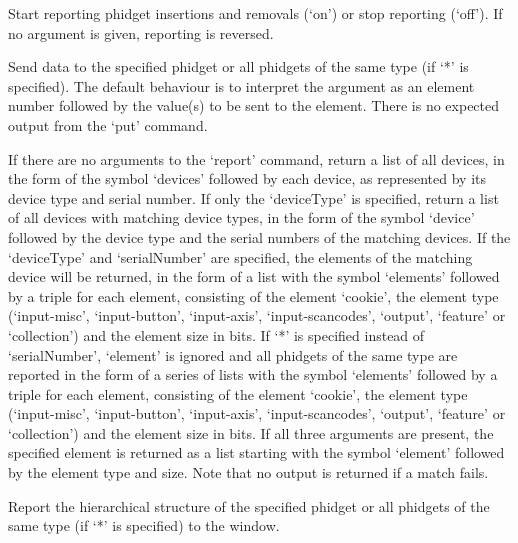   Start reporting phidget insertions and removals (`on') or stop reporting (`off').
  If no argument is given, reporting is reversed. 

  Send data to the specified phidget or all phidgets of the same type (if `*' is specified).
  The default behaviour is to interpret the argument as an element number followed by the value(s) to be sent
  to the element.
  There is no expected output from the `put' command.

  If there are no arguments to the `report' command, return a list of all devices, in the form of the symbol `devices'
  followed by each device, as represented by its device type and serial number.
  If only the `deviceType' is specified, return a list of all devices with matching device types, in the form of the
  symbol `device' followed by the device type and the serial numbers of the matching devices.
  If the `deviceType' and `serialNumber' are specified, the elements of the matching device will be returned,
  in the form of a list with the symbol `elements' followed by a triple for each element,
  consisting of the element `cookie', the element type
  (`input-misc', `input-button', `input-axis', `input-scancodes', `output', `feature' or `collection') and the
  element size in bits.
  If `*' is specified instead of `serialNumber', `element' is ignored and all phidgets of the same type are reported in the
  form of a series of lists with the symbol `elements' followed by a triple for each element,
  consisting of the element `cookie', the element type
  (`input-misc', `input-button', `input-axis', `input-scancodes', `output', `feature' or `collection') and the
  element size in bits.
  If all three arguments are present, the specified element is returned as a list starting with the symbol
  `element' followed by the element type and size.
  Note that no output is returned if a match fails.

  Report the hierarchical structure of the specified phidget or all phidgets of the same type (if `*' is specified)
  to the \MaxName{} window.

  \objListCmdEnd

\objItemFile

